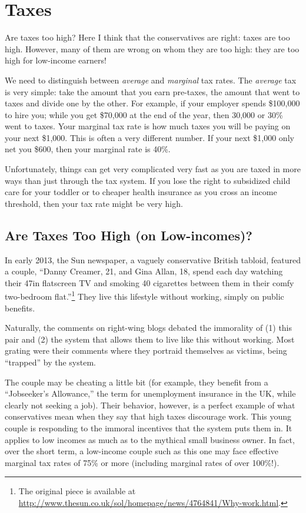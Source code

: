 \chapter{Taxes}%
\label{chpt:taxes}

Are taxes too high? Here I think that the conservatives are right: taxes are
too high. However, many of them are wrong on whom they are too high: they are
too high for low-income earners!

We need to distinguish between \emph{average} and \emph{marginal} tax rates.
The \emph{average} tax is very simple: take the amount that you earn pre-taxes,
the amount that went to taxes and divide one by the other. For example, if your
employer spends \$100,000 to hire you; while you get \$70,000 at the end of the
year, then 30,000 or 30\% went to taxes. Your marginal tax rate is how much
taxes you will be paying on your next \$1,000. This is often a very different
number. If your next \$1,000 only net you \$600, then your marginal rate is
40\%. %

Unfortunately, things can get very complicated very fast as you are taxed in
more ways than just through the tax system. If you lose the right to subsidized
child care for your toddler or to cheaper health insurance as you cross an
income threshold, then your tax rate might be very high.

\section{Are Taxes Too High (on Low-incomes)?}

In early 2013, the Sun newspaper, a vaguely conservative British tabloid,
featured a couple, ``Danny Creamer, 21, and Gina Allan, 18, spend each day
watching their 47in flatscreen TV and smoking 40 cigarettes between them in
their comfy two-bedroom flat.''\footnote{The original piece is available at
\url{http://www.thesun.co.uk/sol/homepage/news/4764841/Why-work.html}.} They
live this lifestyle without working, simply on public benefits.

Naturally, the comments on right-wing blogs debated the immorality of (1) this
pair and (2) the system that allows them to live like this without working.
Most grating were their comments where they portraid themselves as victims,
being ``trapped'' by the system.

The couple may be cheating a little bit (for example, they benefit from a
``Jobseeker's Allowance,'' the term for unemployment insurance in the UK, while
clearly not seeking a job). Their behavior, however, is a perfect example of
what conservatives mean when they say that high taxes discourage work. This
young couple is responding to the immoral incentives that the system puts them
in. It applies to low incomes as much as to the mythical small business owner.
In fact, over the short term, a low-income couple such as this one may face
effective marginal tax rates of 75\% or more (including marginal rates of over
100\%!).

